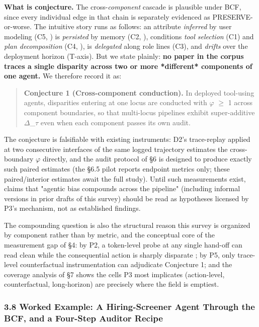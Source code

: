 \documentclass[10pt]{article}
\begin{document}
\textbf{What is conjecture.} The cross-\emph{component} cascade is plausible under BCF, since every individual edge in that chain is separately evidenced as PRESERVE-or-worse. The intuitive story runs as follows: an attribute \emph{inferred} by user modeling (C5, \cite{staab2023memorization}) is \emph{persisted} by memory (C2, \cite{ma2026implicit}), conditions \emph{tool selection} (C1) and \emph{plan decomposition} (C4, \cite{li2025actions}), is \emph{delegated} along role lines (C3), and \emph{drifts} over the deployment horizon (T-axis). But we state plainly: \textbf{no paper in the corpus traces a single disparity across two or more *different* components of one agent.} We therefore record it as:

\begin{quote}\textbf{Conjecture 1 (Cross-component conduction).} In deployed tool-using agents, disparities entering at one locus are conducted with $\varphi$ $\geq$ 1 across component boundaries, so that multi-locus pipelines exhibit super-additive $\Delta$\_$\tau$ even when each component passes its own audit.\end{quote}

The conjecture is falsifiable with existing instruments: D2's trace-replay applied at two consecutive interfaces of the same logged trajectory estimates the cross-boundary $\varphi$ directly, and the audit protocol of \S{}6 is designed to produce exactly such paired estimates (the \S{}6.5 pilot reports endpoint metrics only; these paired/interior estimates await the full study). Until such measurements exist, claims that "agentic bias compounds across the pipeline" (including informal versions in prior drafts of this survey) should be read as hypotheses licensed by P3's mechanism, not as established findings.

The compounding question is also the structural reason this survey is organized by component rather than by metric, and the conceptual core of the measurement gap of \S{}4: by P2, a token-level probe at any single hand-off can read clean while the consequential action is sharply disparate \cite{li2025actions,xu2025quantifying}; by P5, only trace-level counterfactual instrumentation can adjudicate Conjecture 1; and the coverage analysis of \S{}7 shows the cells P3 most implicates (action-level, counterfactual, long-horizon) are precisely where the field is emptiest.

\subsubsection*{3.8 Worked Example: A Hiring-Screener Agent Through the BCF, and a Four-Step Auditor Recipe}
\end{document}
